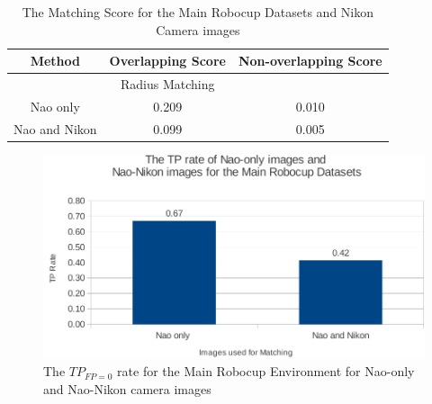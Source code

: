 \documentclass[11pt]{report}
\begin{document}
\begin{table}
\caption{The Matching Score for the Main Robocup Datasets and Nikon Camera
images}
\begin{tabular}{|c|c|c|}
\hline 
Method & Overlapping Score & Non-overlapping Score\tabularnewline
\hline 
\hline 
 & Radius Matching & \tabularnewline
\hline 
Nao only & 0.209 & 0.010\tabularnewline
\hline 
Nao and Nikon & 0.099 & 0.005\tabularnewline
\hline 
\end{tabular}
\label{tab:nkmrdMS}
\end{table}


\begin{figure}[h!] 
  \centering
    \includegraphics[width=1.0\textwidth]{../Drawings/Graphs/tp_rate_nikon_mrd.pdf}
    \caption{The $TP_{FP=0}$ rate for the Main Robocup Environment for Nao-only and Nao-Nikon camera images}
    \label{fig:tp_rate_nikon_mrd.pdf}
\end{figure}

\end{document}
